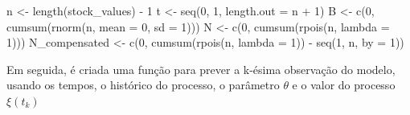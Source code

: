 \documentclass[
  letterpaper,
  DIV=11,
  numbers=noendperiod]{scrreprt}
\newenvironment{Shaded}{\begin{snugshade}}{\end{snugshade}}
\newcommand{\AttributeTok}[1]{\textcolor[rgb]{0.40,0.45,0.13}{#1}}
\newcommand{\DecValTok}[1]{\textcolor[rgb]{0.68,0.00,0.00}{#1}}
\newcommand{\FunctionTok}[1]{\textcolor[rgb]{0.28,0.35,0.67}{#1}}
\newcommand{\NormalTok}[1]{\textcolor[rgb]{0.00,0.23,0.31}{#1}}
\newcommand{\OtherTok}[1]{\textcolor[rgb]{0.00,0.23,0.31}{#1}}
\newcommand{\SpecialCharTok}[1]{\textcolor[rgb]{0.37,0.37,0.37}{#1}}
\begin{document}
\begin{Shaded}
\begin{Highlighting}[]
\NormalTok{n }\OtherTok{\textless{}{-}} \FunctionTok{length}\NormalTok{(stock\_values) }\SpecialCharTok{{-}} \DecValTok{1}
\NormalTok{t }\OtherTok{\textless{}{-}} \FunctionTok{seq}\NormalTok{(}\DecValTok{0}\NormalTok{, }\DecValTok{1}\NormalTok{, }\AttributeTok{length.out =}\NormalTok{ n }\SpecialCharTok{+} \DecValTok{1}\NormalTok{)}
\NormalTok{B }\OtherTok{\textless{}{-}} \FunctionTok{c}\NormalTok{(}\DecValTok{0}\NormalTok{, }\FunctionTok{cumsum}\NormalTok{(}\FunctionTok{rnorm}\NormalTok{(n, }\AttributeTok{mean =} \DecValTok{0}\NormalTok{, }\AttributeTok{sd =} \DecValTok{1}\NormalTok{)))}
\NormalTok{N }\OtherTok{\textless{}{-}} \FunctionTok{c}\NormalTok{(}\DecValTok{0}\NormalTok{, }\FunctionTok{cumsum}\NormalTok{(}\FunctionTok{rpois}\NormalTok{(n, }\AttributeTok{lambda =} \DecValTok{1}\NormalTok{)))}
\NormalTok{N\_compensated }\OtherTok{\textless{}{-}} \FunctionTok{c}\NormalTok{(}\DecValTok{0}\NormalTok{, }\FunctionTok{cumsum}\NormalTok{(}\FunctionTok{rpois}\NormalTok{(n, }\AttributeTok{lambda =} \DecValTok{1}\NormalTok{)) }\SpecialCharTok{{-}} \FunctionTok{seq}\NormalTok{(}\DecValTok{1}\NormalTok{, n, }\AttributeTok{by =} \DecValTok{1}\NormalTok{))}
\end{Highlighting}
\end{Shaded}

Em seguida, é criada uma função para prever a k-ésima observação do
modelo, usando os tempos, o histórico do processo, o parâmetro
\(\theta\) e o valor do processo \(\xi(t_{k})\)
\end{document}
